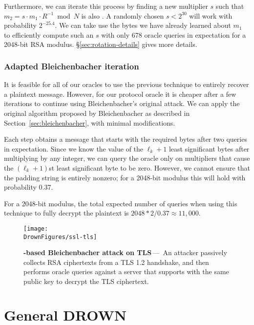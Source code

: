 Furthermore, we can iterate this process by finding a new multiplier $s$ such that $m_2 = s \cdot m_1 \cdot R^{-1} \bmod N$ is also \sslconform.  A randomly chosen $s < 2^{30}$ will work with probability $2^{-25.4}$.  We can take use the bytes we have already learned about $m_1$ to efficiently compute such an $s$ with only 678 oracle queries in expectation for a 2048-bit RSA modulus.   \S\ref{sec:rotation-details} gives more details.

\subsubsection{Adapted Bleichenbacher iteration}
\label{sec:bb-iteration}
It is feasible for all of our oracles to use the previous technique to entirely recover a plaintext message.  However, for our \ssltwo protocol oracle it is cheaper after a few iterations to continue using Bleichenbacher's original attack.  We can apply the original algorithm proposed by Bleichenbacher as described in Section~\ref{sec:bleichenbacher}\ifext, with minimal modifications\fi.

Each step obtains a message that starts with the required  bytes after two queries in expectation.
Since we know the value of the $\ell_k+1$ least significant bytes after multiplying by any integer, we can query the oracle only on multipliers that cause the $(\ell_k+1)$st least significant byte to be zero.  However, we cannot ensure that the padding string is entirely nonzero; for a 2048-bit modulus this will hold with probability 0.37.

For a 2048-bit modulus, the total expected number of queries when using this technique to fully decrypt the plaintext is $2048 * 2 / 0.37 \approx 11,000$.


\begin{figure}[t]
	\texttt{[image: \\DrownFigures/ssl-tls]} 
	\caption{\textbf{\ssltwo-based Bleichenbacher attack on TLS}\,---\,%
	An attacker passively collects RSA ciphertexts from a TLS 1.2 handshake, and
    then performs oracle queries against a server that supports \ssltwo with the
	same public key to decrypt the TLS ciphertext.
	}
	\label{fig:ssl-tls}
\end{figure}

\section{General DROWN} 
\label{vulnerability}

